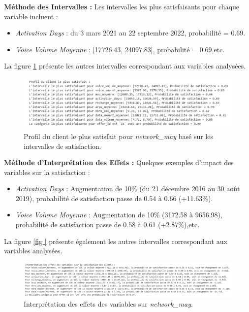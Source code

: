 \textbf{Méthode des Intervalles :}
Les intervalles les plus satisfaisants pour chaque variable incluent :
\begin{itemize}
    \item \textit{Activation Days} : du 3 mars 2021 au 22 septembre 2022, probabilité = 0.69.
    \item \textit{Voice Volume Moyenne} : [17726.43, 24097.83], probabilité = 0.69,etc.
\end{itemize}
La figure \ref{fig:profil_satisfait_may} présente les autres intervalles correspondant aux variables analysées.
\begin{figure}[H]
    \centering
    \includegraphics[width=0.9\linewidth]{capture_modele_33.png}
    \caption{Profil du client le plus satisfait pour \textit{network\_may} basé sur les intervalles de satisfaction.}
    \label{fig:profil_satisfait_may}
\end{figure}

\textbf{Méthode d'Interprétation des Effets :}
Quelques exemples d'impact des variables sur la satisfaction :
\begin{itemize}
    \item \textit{Activation Days} : Augmentation de 10\% (du 21 décembre 2016 au 30 août 2019), probabilité de satisfaction passe de 0.54 à 0.66 (+11.63\%).
    \item \textit{Voice Volume Moyenne} : Augmentation de 10\% (3172.58 à 9656.98), probabilité de satisfaction passe de 0.58 à 0.61 (+2.87\%),etc.
\end{itemize}
La figure \ref{fig
} présente également les autres intervalles correspondant aux variables analysées.

\begin{figure}[H]
    \centering
    \includegraphics[width=0.9\linewidth]{capture_modele_36.png}
    \caption{Interprétation des effets des variables sur \textit{network\_may}.}
    \label{fig:interpretation_effects_may}
\end{figure}
